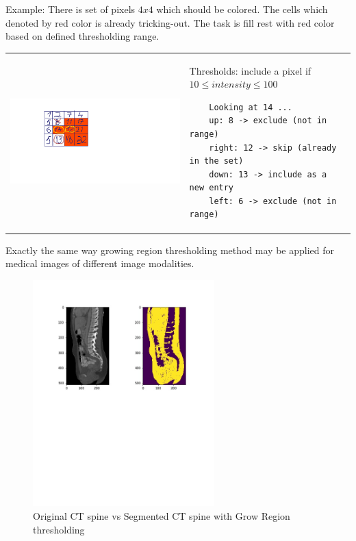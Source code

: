 Example: There is set of pixels $4x4$ which should be colored. The cells which denoted by red color is already tricking-out. The task is fill rest with red color based on defined thresholding range.       

\begin{tabular}{C{7cm}  L{7cm}}
    \includegraphics[width=12cm]{images/grow_region_3.png} & Thresholds: include a pixel if $10 \leq intensity \leq 100$ \newline 
    \begin{lstlisting}
    Looking at 14 ...
    up: 8 -> exclude (not in range)
    right: 12 -> skip (already in the set)
    down: 13 -> include as a new entry
    left: 6 -> exclude (not in range)
    \end{lstlisting}
\end{tabular}

Exactly the same way growing region thresholding method may be applied for medical images of different image modalities.
\begin{figure}[h]
    \centering \includegraphics[width=7cm]{images/ct-spine-grow-region-segmented.jpg}
    \vspace*{-30mm} \caption {Original CT spine vs Segmented CT spine with Grow Region thresholding}
\end{figure}    

